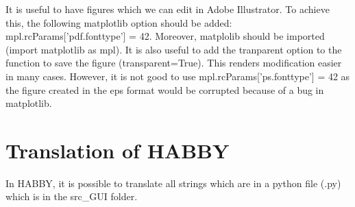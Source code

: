 \documentclass[letterpaper,10pt,english]{sphinxmanual}
\begin{document}

It is useful to have figures which we can edit in Adobe Illustrator. To achieve this, the following matplotlib option should be added:
mpl.rcParams{[}'pdf.fonttype'{]} = 42. Moreover, matplolib should be imported (import matplotlib as mpl). It is also useful to add the tranparent option to the function to save the figure (transparent=True). This renders modification easier in many cases. However, it is not good to use mpl.rcParams{[}'ps.fonttype'{]} = 42 as the figure created in the eps format would be corrupted because of a bug in matplotlib.


\section{Translation of HABBY}
\label{\detokenize{index:translation-of-habby}}
In HABBY, it is possible to translate all strings which are in a python file (.py)
which is in the src\_GUI folder.
\end{document}
